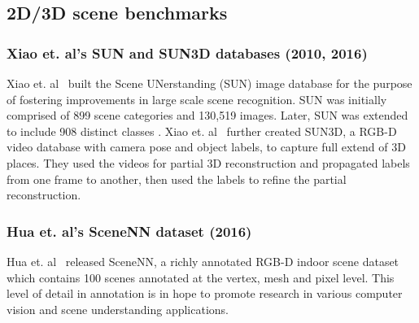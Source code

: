 \begin{itemize}





\end{itemize}


\subsection{2D/3D scene benchmarks} %

\subsubsection{Xiao et. al's SUN and SUN3D databases (2010, 2016)}
Xiao et. al~\cite{DBLP:conf/cvpr/XiaoHEOT10} built the Scene UNerstanding (SUN) image database for the purpose of fostering improvements in  large scale scene recognition. SUN was initially comprised of 899 scene categories and 130,519 images. Later, SUN was extended to include 908 distinct classes \cite{DBLP:journals/ijcv/XiaoEHTO16}. Xiao et. al~\cite{DBLP:conf/iccv/XiaoOT13} further created SUN3D, a RGB-D video database with camera pose and
object labels, to capture full extend of 3D places. They used the videos for partial 3D reconstruction and propagated labels from one frame to another, then used the labels to refine the partial reconstruction. %

\subsubsection{Hua et. al's SceneNN dataset (2016)}
Hua et. al~\cite{DBLP:conf/3dim/HuaPNTYY16} released SceneNN, a richly annotated RGB-D indoor scene dataset which contains 100 scenes annotated at the vertex, mesh and pixel level. This level of detail in annotation is in hope to promote research in various computer vision and scene understanding applications.


